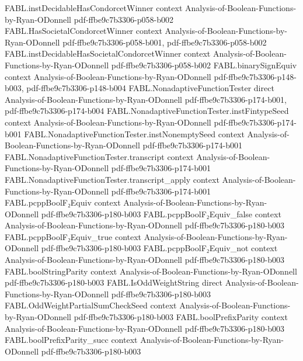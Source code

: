 \begin{theorem}
  {FABL.instDecidableHasCondorcetWinner}
  {context}
  {Analysis-of-Boolean-Functions-by-Ryan-ODonnell}
  {pdf-ffbe9c7b3306-p058-b002}
\proofstep
  {FABL.HasSocietalCondorcetWinner}
  {context}
  {Analysis-of-Boolean-Functions-by-Ryan-ODonnell}
  {pdf-ffbe9c7b3306-p058-b001,
    pdf-ffbe9c7b3306-p058-b002}
\proofstep
  {FABL.instDecidableHasSocietalCondorcetWinner}
  {context}
  {Analysis-of-Boolean-Functions-by-Ryan-ODonnell}
  {pdf-ffbe9c7b3306-p058-b002}
\proofstep
  {FABL.binarySignEquiv}
  {context}
  {Analysis-of-Boolean-Functions-by-Ryan-ODonnell}
  {pdf-ffbe9c7b3306-p148-b003,
    pdf-ffbe9c7b3306-p148-b004}
\proofstep
  {FABL.NonadaptiveFunctionTester}
  {direct}
  {Analysis-of-Boolean-Functions-by-Ryan-ODonnell}
  {pdf-ffbe9c7b3306-p174-b001,
    pdf-ffbe9c7b3306-p174-b004}
\proofstep
  {FABL.NonadaptiveFunctionTester.instFintypeSeed}
  {context}
  {Analysis-of-Boolean-Functions-by-Ryan-ODonnell}
  {pdf-ffbe9c7b3306-p174-b001}
\proofstep
  {FABL.NonadaptiveFunctionTester.instNonemptySeed}
  {context}
  {Analysis-of-Boolean-Functions-by-Ryan-ODonnell}
  {pdf-ffbe9c7b3306-p174-b001}
\proofstep
  {FABL.NonadaptiveFunctionTester.transcript}
  {context}
  {Analysis-of-Boolean-Functions-by-Ryan-ODonnell}
  {pdf-ffbe9c7b3306-p174-b001}
\proofstep
  {FABL.NonadaptiveFunctionTester.transcript_apply}
  {context}
  {Analysis-of-Boolean-Functions-by-Ryan-ODonnell}
  {pdf-ffbe9c7b3306-p174-b001}
\proofstep
  {FABL.pcppBoolF₂Equiv}
  {context}
  {Analysis-of-Boolean-Functions-by-Ryan-ODonnell}
  {pdf-ffbe9c7b3306-p180-b003}
\proofstep
  {FABL.pcppBoolF₂Equiv_false}
  {context}
  {Analysis-of-Boolean-Functions-by-Ryan-ODonnell}
  {pdf-ffbe9c7b3306-p180-b003}
\proofstep
  {FABL.pcppBoolF₂Equiv_true}
  {context}
  {Analysis-of-Boolean-Functions-by-Ryan-ODonnell}
  {pdf-ffbe9c7b3306-p180-b003}
\proofstep
  {FABL.pcppBoolF₂Equiv_not}
  {context}
  {Analysis-of-Boolean-Functions-by-Ryan-ODonnell}
  {pdf-ffbe9c7b3306-p180-b003}
\proofstep
  {FABL.boolStringParity}
  {context}
  {Analysis-of-Boolean-Functions-by-Ryan-ODonnell}
  {pdf-ffbe9c7b3306-p180-b003}
\proofstep
  {FABL.IsOddWeightString}
  {direct}
  {Analysis-of-Boolean-Functions-by-Ryan-ODonnell}
  {pdf-ffbe9c7b3306-p180-b003}
\proofstep
  {FABL.OddWeightPartialSumCheckSeed}
  {context}
  {Analysis-of-Boolean-Functions-by-Ryan-ODonnell}
  {pdf-ffbe9c7b3306-p180-b003}
\proofstep
  {FABL.boolPrefixParity}
  {context}
  {Analysis-of-Boolean-Functions-by-Ryan-ODonnell}
  {pdf-ffbe9c7b3306-p180-b003}
\proofstep
  {FABL.boolPrefixParity_succ}
  {context}
  {Analysis-of-Boolean-Functions-by-Ryan-ODonnell}
  {pdf-ffbe9c7b3306-p180-b003}

\end{theorem}
